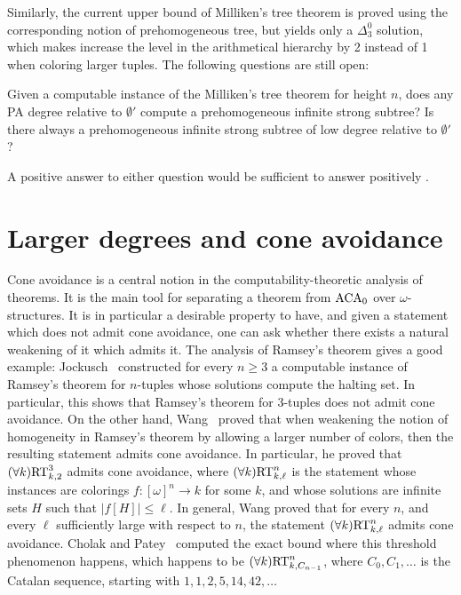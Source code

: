Similarly, the current upper bound of Milliken's tree theorem is proved using the corresponding notion of prehomogeneous tree, but  yields only a $\Delta^0_3$ solution, which makes increase the level in the arithmetical hierarchy by 2 instead of 1 when coloring larger tuples. The following questions are still open:

\begin{question}
Given a computable instance of the Milliken's tree theorem for height $n$, does any PA degree relative to $\emptyset'$ compute a prehomogeneous infinite strong subtree? Is there always a prehomogeneous infinite strong subtree of low degree relative to $\emptyset'$?
\end{question}

A positive answer to either question would be sufficient to answer positively .


\section{Larger degrees and cone avoidance}

Cone avoidance is a central notion in the computability-theoretic analysis of theorems. It is the main tool for separating a theorem from $\mathrm{ACA}_0$ over $\omega$-structures. It is in particular a desirable property to have, and given a statement which does not admit cone avoidance, one can ask whether there exists a natural weakening of it which admits it. The analysis of Ramsey's theorem gives a good example:  Jockusch~\cite{Jockusch1972Ramseys} constructed for every $n \geq 3$ a computable instance of Ramsey's theorem for $n$-tuples whose solutions compute the halting set. In particular, this shows that Ramsey's theorem for 3-tuples does not admit cone avoidance. On the other hand, Wang~\cite[Theorem 3.2]{Wang2014Some} proved that when weakening the notion of homogeneity in Ramsey's theorem by allowing a larger number of colors, then the resulting statement admits cone avoidance. In particular, he proved that $(\forall k)\mathrm{RT}^{3}_{k, 2}$ admits cone avoidance, where $(\forall k)\mathrm{RT}^{n}_{k, \ell}$ is the statement whose instances are colorings $f: [\omega]^n \to k$ for some $k$, and whose solutions are infinite sets $H$ such that $|f[H]| \leq \ell$. In general, Wang proved that for every $n$, and every $\ell$ sufficiently large with respect to $n$, the statement  $(\forall k)\mathrm{RT}^{n}_{k, \ell}$ admits cone avoidance. Cholak and Patey~\cite{Cholak2019Thin} computed the exact bound where this threshold phenomenon happens, which happens to be $(\forall k)\mathrm{RT}^{n}_{k, C_{n-1}}$, where $C_0, C_1, \dots$ is the Catalan sequence, starting with $1, 1, 2, 5, 14, 42, \dots$

